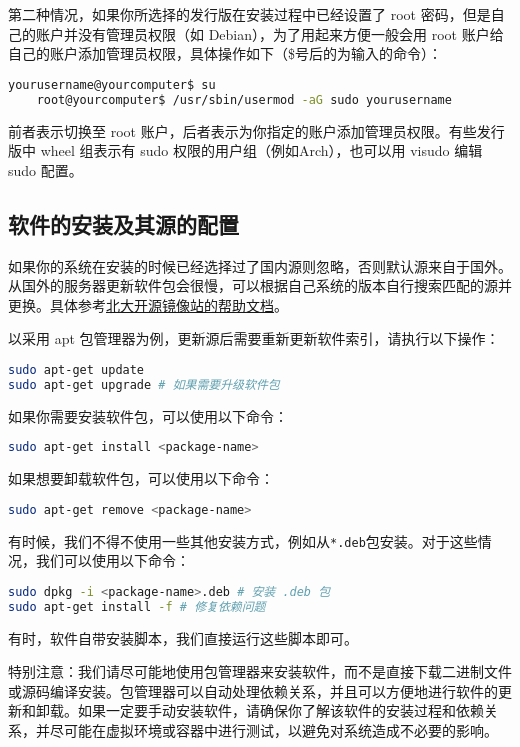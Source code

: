 \documentclass[../main.tex]{subfiles}
\begin{document}
第二种情况，如果你所选择的发行版在安装过程中已经设置了 root 密码，但是自己的账户并没有管理员权限（如 Debian），为了用起来方便一般会用 root 账户给自己的账户添加管理员权限，具体操作如下（\$号后的为输入的命令）：

\begin{lstlisting}[language=bash]
    yourusername@yourcomputer$ su
    root@yourcomputer$ /usr/sbin/usermod -aG sudo yourusername
\end{lstlisting}

前者表示切换至 root 账户，后者表示为你指定的账户添加管理员权限。有些发行版中 wheel 组表示有 sudo 权限的用户组（例如Arch），也可以用 visudo 编辑 sudo 配置。

\subsection{软件的安装及其源的配置}

如果你的系统在安装的时候已经选择过了国内源则忽略，否则默认源来自于国外。从国外的服务器更新软件包会很慢，可以根据自己系统的版本自行搜索匹配的源并更换。具体参考\href{https://mirrors.pku.edu.cn/Help}{北大开源镜像站的帮助文档}。

以采用 apt 包管理器为例，更新源后需要重新更新软件索引，请执行以下操作：

\begin{lstlisting}[language=bash]
sudo apt-get update
sudo apt-get upgrade # 如果需要升级软件包
\end{lstlisting}

如果你需要安装软件包，可以使用以下命令：
\begin{lstlisting}[language=bash]
sudo apt-get install <package-name>
\end{lstlisting}

如果想要卸载软件包，可以使用以下命令：
\begin{lstlisting}[language=bash]
sudo apt-get remove <package-name>
\end{lstlisting}

有时候，我们不得不使用一些其他安装方式，例如从\texttt{*.deb}包安装。对于这些情况，我们可以使用以下命令：

\begin{lstlisting}[language=bash]
sudo dpkg -i <package-name>.deb # 安装 .deb 包
sudo apt-get install -f # 修复依赖问题
\end{lstlisting}

有时，软件自带安装脚本，我们直接运行这些脚本即可。

特别注意：我们请尽可能地使用包管理器来安装软件，而不是直接下载二进制文件或源码编译安装。包管理器可以自动处理依赖关系，并且可以方便地进行软件的更新和卸载。如果一定要手动安装软件，请确保你了解该软件的安装过程和依赖关系，并尽可能在虚拟环境或容器中进行测试，以避免对系统造成不必要的影响。
\end{document}
